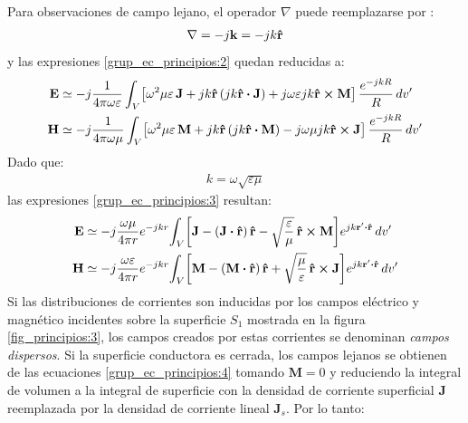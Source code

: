 Para observaciones de campo lejano, el operador $\nabla$ puede reemplazarse por \cite{Cheng}:
\begin{align}
\nabla = - j\mathbf{k} = -jk\bm{\mathbf{\hat{r}}}
\label{ec_principios:29}
\end{align}
y las expresiones \eqref{grup_ec_principios:2} quedan reducidas a:
\begin{subequations}
\label{grup_ec_principios:3}
\begin{align}
\mathbf{E} &\simeq -j\frac{1}{4\pi\omega\varepsilon}\int_{V}\!\left[\omega^2\mu\varepsilon\,\mathbf{J} + jk\bm{\mathbf{\hat{r}}}\left(jk\bm{\mathbf{\hat{r}}}\boldsymbol{\cdot}\mathbf{J}\right) + j\omega\varepsilon jk\bm{\mathbf{\hat{r}}}\boldsymbol{\times}\mathbf{M}\right]\frac{e^{- jkR}}{R}\,dv'
\label{ec_principios:30}\\
\mathbf{H} &\simeq -j\frac{1}{4\pi\omega\mu}\int_{V}\!\left[\omega^2\mu\varepsilon\,\mathbf{M} + jk\bm{\mathbf{\hat{r}}}\left(jk\bm{\mathbf{\hat{r}}}\boldsymbol{\cdot}\mathbf{M}\right) - j\omega\mu jk\bm{\mathbf{\hat{r}}}\boldsymbol{\times}\mathbf{J}\right]\frac{e^{- jkR}}{R}\,dv'
\label{ec_principios:31}
\end{align}
\end{subequations}
Dado que:
\begin{align}
k = \omega\sqrt{\varepsilon\mu}
\label{ec_principios:32}
\end{align}
las expresiones \eqref{grup_ec_principios:3} resultan:
\begin{subequations}
\label{grup_ec_principios:4}
\begin{align}
\mathbf{E} &\simeq -j\frac{\omega\mu}{4\pi r}e^{- jkr}\!\int_{V}\!\left[\mathbf{J} - \left(\mathbf{J}\boldsymbol{\cdot}\bm{\mathbf{\hat{r}}}\right)\bm{\mathbf{\hat{r}}} - \sqrt{\frac{\varepsilon}{\mu}}\,\bm{\mathbf{\hat{r}}}\boldsymbol{\times}\mathbf{M}\right]\!e^{jk\mathbf{r}'\boldsymbol{\cdot}\bm{\mathbf{\hat{r}}}}\,dv'
\label{ec_principios:33}\\
\mathbf{H} &\simeq -j\frac{\omega\varepsilon}{4\pi r}e^{- jkr}\!\int_{V}\!\left[\mathbf{M} - \left(\mathbf{M}\boldsymbol{\cdot}\bm{\mathbf{\hat{r}}}\right)\bm{\mathbf{\hat{r}}} + \sqrt{\frac{\mu}{\varepsilon}}\,\bm{\mathbf{\hat{r}}}\boldsymbol{\times}\mathbf{J}\right]\!e^{jk\mathbf{r}'\boldsymbol{\cdot}\bm{\mathbf{\hat{r}}}}\,dv'
\label{ec_principios:34}
\end{align}
\end{subequations}
Si las distribuciones de corrientes son inducidas por los campos eléctrico y magnético incidentes sobre la superficie $S_1$ mostrada en la figura \ref{fig_principios:3}, los campos creados por estas corrientes se denominan \emph{campos dispersos}. Si la superficie conductora es cerrada, los campos lejanos se obtienen de las ecuaciones \eqref{grup_ec_principios:4} tomando $\mathbf{M} = 0$ y reduciendo la integral de volumen a la integral de superficie con la densidad de corriente superficial $\mathbf{J}$ reemplazada por la densidad de corriente lineal  $\mathbf{J}_s$. Por lo tanto:
